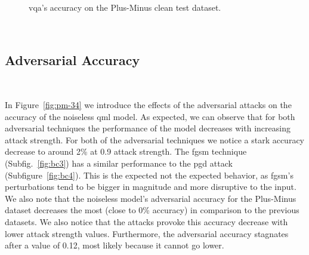 \begin{figure}[!h]
  \caption{\ac{vqa}'s accuracy on the Plus-Minus clean test dataset.}
  \label{fig:pm-12}
\end{figure} \

\subsection{Adversarial Accuracy}\label{subsection:plus-minus-adv-acc} \

In Figure~\ref{fig:pm-34} we introduce the effects of the
adversarial attacks on the accuracy of the noiseless \ac{qml}
model. As expected, we can observe that for both adversarial
techniques the performance of the model decreases with increasing
attack strength. For both of the adversarial techniques
we notice a stark accuracy decrease to around 2\% at 0.9 attack
strength. The \ac{fgsm} technique (Subfig.~\ref{fig:bc3}) has a
similar performance to the \ac{pgd} attack (Subfigure~\ref{fig:bc4}).
This is the expected not the expected behavior, as \ac{fgsm}'s
perturbations tend to be bigger in magnitude and more disruptive
to the input. We also note that the noiseless model's adversarial
accuracy for the Plus-Minus dataset decreases the most (close to
0\% accuracy) in comparison to the previous datasets. We also
notice that the attacks provoke this accuracy decrease with
lower attack strength values. Furthermore, the adversarial accuracy
stagnates after a value of 0.12, most likely because it cannot
go lower. \

